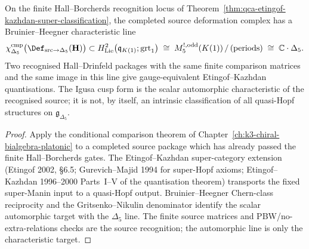 \begin{theorem}
\label{thm:qca-classification-invariant}
On the finite Hall--Borcherds recognition locus of
Theorem~\ref{thm:qca-etingof-kazhdan-super-classification}, the
completed source deformation complex has a Bruinier--Heegner
characteristic line
\[
 \chi^{\mathrm{cmp}}_{\Delta_5}\bigl(\Def_{\mathrm{src}\to\Delta_5}(\mathbf H)\bigr)
 \subset
 H^2_{\mathrm{Lie}}\bigl(\mathfrak q_{K(1)};\mathrm{grt}_1\bigr)
 \;\cong\;
 M^{!,\mathrm{odd}}_{5}(K(1))\,/\,(\text{periods})
 \;\cong\;
 \mathbb{C}\cdot\Delta_5.
\]
Two recognised Hall--Drinfeld packages with the same finite comparison
matrices and the same image in this line give gauge-equivalent
Etingof--Kazhdan quantisations. The Igusa cusp form is the scalar
automorphic characteristic of the recognised source; it is not, by
itself, an intrinsic classification of all quasi-Hopf structures on
$\mathfrak{g}_{\Delta_5}$.
\end{theorem}

\begin{proof}
Apply the conditional comparison theorem of
Chapter~\ref{ch:k3-chiral-bialgebra-platonic} to a completed source
package which has already passed the finite Hall--Borcherds gates. The
Etingof--Kazhdan super-category extension (Etingof 2002, \S 6.5;
Gurevich--Majid 1994 for super-Hopf axioms; Etingof--Kazhdan 1996--2000
Parts~I--V of the quantisation theorem) transports the fixed
super-Manin input to a quasi-Hopf output. Bruinier--Heegner
Chern-class reciprocity and the Gritsenko--Nikulin denominator identify
the scalar automorphic target with the $\Delta_5$ line. The finite
source matrices and PBW/no-extra-relations checks are the source
recognition; the automorphic line is only the characteristic target.
\end{proof}

